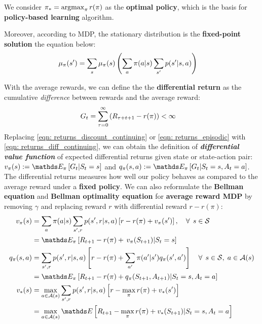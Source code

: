 \documentclass[11pt]{article}
\begin{document}
\begin{itemize}
We consider $\pi_{*} = \operatorname{argmax}_{\pi}r(\pi)$ as the \textbf{optimal policy}, which is the basis for \textbf{policy-based learning} algorithm. 

Moreover, according to MDP, the stationary distribution is the \textbf{fixed-point solution} the equation below:
\begin{align}
\mu_{\pi}(s') &= \sum_{s}\mu_{\pi}(s)\left(\sum_{a}\pi(a|s) \sum_{s'}p(s'| s, a)\right) \label{eqn: stationary_dist_eqn}
\end{align} 

With the average rewards, we can define the the \textbf{differential return} as the cumulative \emph{difference} between rewards and the average reward:
\begin{align}
G_{t} &= \sum_{\tau=0}^{\infty}\left(R_{\tau+t+1} - r(\pi)\right) < \infty \label{eqn: returns_diff_continuing}
\end{align}  Replacing \eqref{eqn: returns_discount_continuing} or \eqref{eqn: returns_episodic} with \eqref{eqn: returns_diff_continuing}, we can obtain the definition of \textbf{\emph{differential value function}} of expected differential returns given state or state-action pair: $v_{\pi}(s):= \E{\pi}{G_{t}  | S_{t}=s}$ and $q_{\pi}(s, a):= \E{\pi}{G_{t}  | S_{t}=s, A_{t}=a}$.  The differential returns measures how well our policy behaves as compared to the average reward under a \textbf{fixed policy}. We can also reformulate the \textbf{Bellman equation} and \textbf{Bellman optimality equation} for \textbf{average reward MDP} by removing $\gamma$ and replacing reward $r$ with differential reward $r-r(\pi)$: 
\begin{align}
v_{\pi}(s) &= \sum_{a}\pi(a|s)\sum_{s', r}p(s', r| s, a)\brac{r - r(\pi) + v_{\pi}(s')}, \quad \forall\,\; s\in \cS \label{eqn: bellman_eqn_value_diff} \\
&= \E{\pi}{R_{t+1} - r(\pi)  + \,v_{\pi}(S_{t+1}) | S_{t} = s} \label{eqn: bellman_eqn_value_diff_2}\\
q_{\pi}(s, a) &=\sum_{s', r}p(s', r|s,a)\brac{r - r(\pi) +  \sum_{a'}\pi(a'|s')q_{\pi}(s', a')} \quad \forall\,\; s\in \cS, \; a\in \cA(s) \label{eqn: bellman_eqn_value_action_diff}\\
&=\E{\pi}{R_{t+1} - r(\pi)  + q_{\pi}(S_{t+1}, A_{t+1}) | S_{t}=s, A_{t}=a}  \label{eqn: bellman_eqn_value_action_diff_2}\\
v_{*}(s) &= \max_{a\in \cA(s)}\sum_{s', r}p(s', r|s, a)\brac{r - \max_{\pi}r(\pi) + v_{*}(s')} \label{eqn: bellman_opt_eqn_value_diff}\\
 &=  \max_{a\in \cA(s)}\E{}{R_{t+1} - \max_{\pi}r(\pi) + v_{*}(S_{t+1}) | S_{t}=s, A_{t}=a} \label{eqn: bellman_opt_eqn_value_diff_2} \\

\end{align}
\end{itemize}
\end{document}
